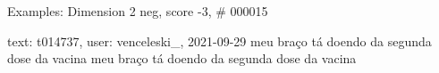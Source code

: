 \begin{frame}{Examples: Dimension 2 neg, score -3, \# 000015}
\footnotesize
\begin{alertblock}{text: t014737, user: venceleski\_, 2021-09-29}
meu braço tá doendo da segunda dose da vacina  
   meu braço 
tá doendo da segunda dose da vacina \textbf{} 
\textbf{}  
  
\end{alertblock}
\end{frame}
